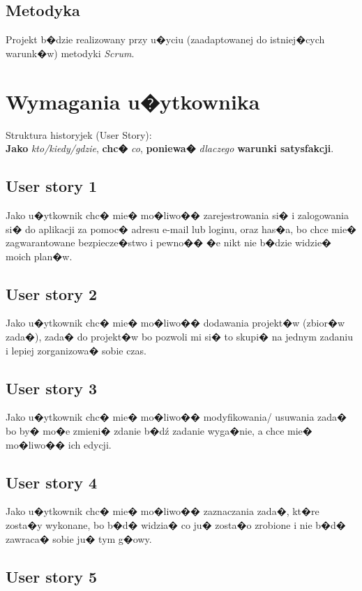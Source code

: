 ﻿\documentclass[a4paper]{article}
\begin{document}
\subsection{Metodyka}
\label{subsec:Metodyka}

Projekt b�dzie realizowany przy u�yciu (zaadaptowanej do istniej�cych warunk�w) metodyki {\em Scrum}. 

\section{Wymagania u�ytkownika}
\label{sec:WymaganiaUzytkownika}
Struktura historyjek (User Story):\\
\textbf{Jako} \textit{kto/kiedy/gdzie}, \textbf{chc�} \textit{co}, \textbf{poniewa�}  \textit{dlaczego} \textbf{warunki satysfakcji}.

\subsection{User story 1}
\label{subsec:UserStory1}
Jako u�ytkownik chc� mie� mo�liwo�� zarejestrowania si� i zalogowania si� do aplikacji za pomoc� adresu e-mail lub loginu, oraz has�a, bo chce mie� zagwarantowane bezpiecze�stwo i pewno�� �e nikt nie b�dzie widzie� moich plan�w.

\subsection{User story 2}
\label{subsec:UserStory2}
Jako u�ytkownik chc� mie� mo�liwo�� dodawania projekt�w (zbior�w zada�), zada� do projekt�w bo pozwoli mi si� to skupi� na jednym zadaniu i lepiej zorganizowa� sobie czas.

\subsection{User story 3}
\label{subsec:UserStory3}
Jako u�ytkownik chc� mie� mo�liwo�� modyfikowania/ usuwania zada� bo by� mo�e zmieni� zdanie b�dź zadanie wyga�nie, a chce mie� mo�liwo�� ich edycji.

\subsection{User story 4}
\label{subsec:UserStory4}
Jako u�ytkownik chc� mie� mo�liwo�� zaznaczania zada�, kt�re zosta�y wykonane, bo b�d� widzia� co ju� zosta�o zrobione i nie b�d� zawraca� sobie ju� tym g�owy.

\subsection{User story 5}
\label{subsec:UserStory5}
\end{document}
